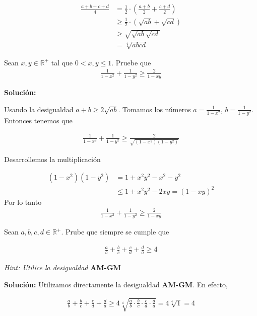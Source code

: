 \documentclass[12pt]{book}
\begin{document}
\begin{align*}
    \frac{a+b+c+d}{4}&=\frac{1}{2}\cdot \left(\frac{a+b}{2}+\frac{c+d}{2} \right) \\
    &\geq \frac{1}{2}\cdot(\sqrt{ab}+\sqrt{cd}) \\
   &\geq \sqrt{\sqrt{ab}\sqrt{cd}} \\
   &=\sqrt[4]{abcd}
\end{align*}

\begin{prob}{}{}
    Sean $x,y \in \mathbb{R}^+$ tal que $0<x,y\leq 1$. Pruebe que 
    \begin{align*}
        \frac{1}{1-x^2}+\frac{1}{1-y^2}\geq \frac{2}{1-xy}
    \end{align*}
\end{prob}
\textbf{Solución:}

Usando la desigualdad $a+b \geq 2 \sqrt{ab}$. Tomamos los números $\displaystyle a=\frac{1}{1-x^2}$, $\displaystyle b=\frac{1}{1-y^2}$. Entonces tenemos que 

\begin{align*}
      \frac{1}{1-x^2}+\frac{1}{1-y^2}\geq \frac{2}{\sqrt{(1-x^2)(1-y^2)}}
\end{align*}

Desarrollemos la multiplicación

\begin{align*}
    (1-x^2)(1-y^2)&=1+x^2y^2-x^2-y^2 \\
    &\leq 1+x^2y^2-2xy=(1-xy)^2
\end{align*}
Por lo tanto
  \begin{align*}
        \frac{1}{1-x^2}+\frac{1}{1-y^2}\geq \frac{2}{1-xy}
    \end{align*}

\begin{prob}{}{}
    Sean $a,b,c,d \in \mathbb{R}^+$. Prube que siempre se cumple que 

    \begin{align*}
        \frac{a}{b}+\frac{b}{c}+\frac{c}{d}+\frac{d}{a} \geq 4
    \end{align*}

    \emph{Hint: Utilice la desigualdad} \textbf{AM-GM}
\end{prob}
\textbf{Solución:} Utilizamos directamente la  desigualdad \textbf{AM-GM}. En efecto,

\begin{align*}
      \frac{a}{b}+\frac{b}{c}+\frac{c}{d}+\frac{d}{a} \geq 4 \sqrt[4]{\frac{a}{b}\cdot \frac{b}{c}\cdot \frac{c}{d} \cdot \frac{d}{a}}= 4 \sqrt[4]{1}=4
\end{align*}
\end{document}
